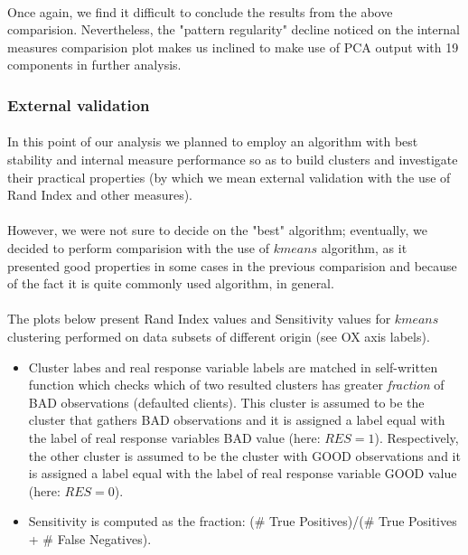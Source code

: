 \documentclass[10pt]{article}\usepackage[]{graphicx}\usepackage[]{color}
\begin{document}
\paragraph{}
Once again, we find it difficult to conclude the results from the above comparision.
Nevertheless, the "pattern regularity" decline noticed on the 
internal measures comparision plot makes us inclined to make use of 
PCA output with 19 components in further analysis. 


\subsubsection{External validation}
\paragraph{}
In this point of our analysis we planned to employ an algorithm with 
best stability and internal measure performance so as to build clusters 
and investigate their practical properties (by which we mean 
external validation with the use of Rand Index and other measures).
\paragraph{}
However, we were not sure to decide on the "best" algorithm; eventually,
we decided to perform comparision with the use of $kmeans$ algorithm,
as it presented good properties in some cases in the previous comparision
and because of the fact it is quite commonly used algorithm, in general. 
\paragraph{}
The plots below present Rand Index values and Sensitivity values for 
$kmeans$ clustering performed on data subsets of different origin (see OX axis labels).
\begin{itemize}
\item Cluster labes and real response variable labels are matched in self-written function
which checks which of two resulted clusters has greater \textit{fraction} of BAD observations
(defaulted clients). This cluster is assumed to be the cluster that gathers BAD observations
and it is assigned a label equal with the label of real response variables BAD value 
(here: $RES=1$). Respectively, the other cluster is assumed to be the cluster with GOOD observations
 and it is assigned a label equal with the label of real response variable GOOD value 
(here: $RES=0$).
\item Sensitivity is computed as the fraction: (\# True Positives)/(\# True Positives + 
\# False Negatives). 
\end{itemize}
\end{document}
